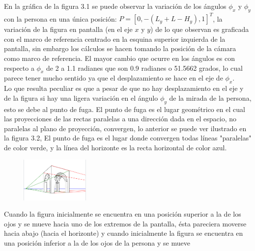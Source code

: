 \documentclass[paper=a4, fontsize=11pt]{scrartcl} %
\numberwithin{equation}{section} %
\numberwithin{figure}{section} %
\numberwithin{table}{section} %
\begin{document}
En la gráfica de la figura 3.1 se puede observar la variación de los ángulos $\phi_x$ y $\phi_y$ con la persona en una única posición: $P=[0, -(L_y+L-H_y), 1]^T$, la variación de la figura en pantalla (en el eje $x$ y $y$) de lo que observan es graficada con el marco de referencia centrado en la esquina superior izquierda de la pantalla, sin embargo los cálculos se hacen tomando la posición de la cámara como marco de referencia. El mayor cambio que ocurre en los ángulos es con respecto a $\phi_x$ de 2 a 1.1 radianes que son 0.9 radianes o 51.5662 grados, lo cual parece tener mucho sentido ya que el desplazamiento se hace en el eje de $\phi_x$. 
\\Lo que resulta peculiar es que a pesar de que no hay desplazamiento en el eje y de la figura  si hay una ligera variación en el ángulo $\phi_y$ de la mirada de la persona, esto se debe al punto de fuga. El punto de fuga es el lugar geométrico en el cual las proyecciones de las rectas paralelas a una dirección dada en el espacio, no paralelas al plano de proyección, convergen, lo anterior se puede ver ilustrado en la figura 3.2, El punto de fuga es el lugar donde convergen todas líneas "paralelas" de color verde, y la línea del horizonte es la recta horizontal de color azul.
\begin{figure}[htbp]
	\centering
	\includegraphics[width=0.3\textwidth]{fuga}
	\caption{}\label{fig: figura}
\end{figure}
Cuando la figura inicialmente se encuentra en una posición superior a la de los ojos y se mueve hacia uno de los extremos de la pantalla, ésta pareciera moverse hacia abajo (hacia el horizonte) y cuando inicialmente la figura se encuentra en una posición inferior a la de los ojos de la persona y se mueve 
%
%    
%
\end{document}
